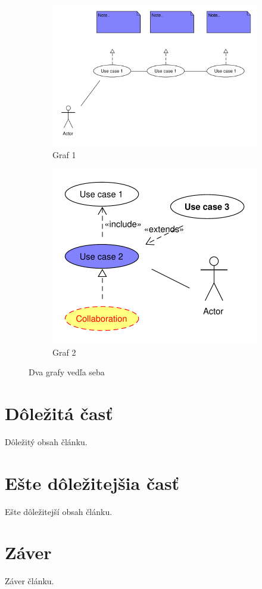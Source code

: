 \documentclass[10pt,twocolumn,twoside,slovak,a4paper]{article}
\begin{document}
\begin{figure}[h!]
\centering
\begin{subfigure}{.45\textwidth}
  \centering
  \includegraphics[width=\linewidth]{graf1.pdf} %
  \caption{Graf 1}
\end{subfigure}%
\hfill
\begin{subfigure}{.45\textwidth}
  \centering
  \includegraphics[width=\linewidth]{graf2.pdf} %
  \caption{Graf 2}
\end{subfigure}
\caption{Dva grafy vedľa seba}
\end{figure}

\section{Dôležitá časť} \label{dolezita}
Dôležitý obsah článku.

\section{Ešte dôležitejšia časť} \label{dolezitejsia}
Ešte dôležitejší obsah článku.

\section{Záver} \label{zaver}
Záver článku.

\end{document}
